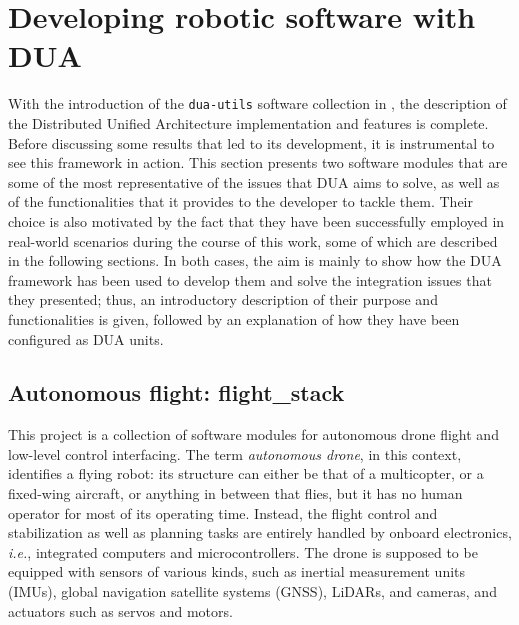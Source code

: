 \section{Developing robotic software with DUA}
\label{sec:dua_modules}
With the introduction of the \texttt{dua-utils} software collection in , the description of the Distributed Unified Architecture implementation and features is complete. Before discussing some results that led to its development, it is instrumental to see this framework in action. This section presents two software modules that are some of the most representative of the issues that DUA aims to solve, as well as of the functionalities that it provides to the developer to tackle them. Their choice is also motivated by the fact that they have been successfully employed in real-world scenarios during the course of this work, some of which are described in the following sections. In both cases, the aim is mainly to show how the DUA framework has been used to develop them and solve the integration issues that they presented; thus, an introductory description of their purpose and functionalities is given, followed by an explanation of how they have been configured as DUA units.

\subsection{Autonomous flight: flight\_stack}
\label{sec:dua_modules_flight_stack}
This project is a collection of software modules for autonomous drone flight and low-level control interfacing. The term \emph{autonomous drone}, in this context, identifies a flying robot: its structure can either be that of a multicopter, or a fixed-wing aircraft, or anything in between that flies, but it has no human operator for most of its operating time. Instead, the flight control and stabilization as well as planning tasks are entirely handled by onboard electronics, \emph{i.e.}, integrated computers and microcontrollers. The drone is supposed to be equipped with sensors of various kinds, such as inertial measurement units (IMUs), global navigation satellite systems (GNSS), LiDARs, and cameras, and actuators such as servos and motors.

